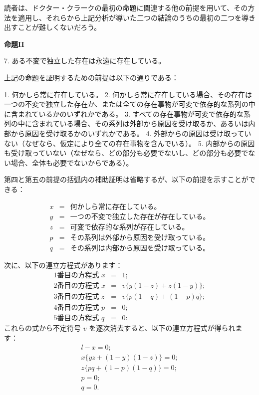 \documentclass[a4paper,11pt,openany]{ltjsbook}
\begin{document}
読者は、ドクター・クラークの最初の命題に関連する他の前提を用いて、その方法を適用し、それらから上記分析が導いた二つの結論のうちの最初の二つを導き出すことが難しくないだろう。

\textbf{命題II}

7. ある不変で独立した存在は永遠に存在している。

上記の命題を証明するための前提は以下の通りである：

1. 何かしら常に存在している。
2. 何かしら常に存在している場合、その存在は一つの不変で独立した存在か、または全ての存在事物が可変で依存的な系列の中に含まれているかのいずれかである。
3. すべての存在事物が可変で依存的な系列の中に含まれている場合、その系列は外部から原因を受け取るか、あるいは内部から原因を受け取るかのいずれかである。
4. 外部からの原因は受け取っていない（なぜなら、仮定により全ての存在事物を含んでいる）。
5. 内部からの原因も受け取っていない（なぜなら、どの部分も必要でないし、どの部分も必要でない場合、全体も必要でないからである）。

第四と第五の前提の括弧内の補助証明は省略するが、以下の前提を示すことができる：

\begin{eqnarray*}
x &=& \text{何かしら常に存在している。} \\
y &=& \text{一つの不変で独立した存在が存在している。} \\
z &=& \text{可変で依存的な系列が存在している。} \\
p &=& \text{その系列は外部から原因を受け取っている。} \\
q &=& \text{その系列は内部から原因を受け取っている。}
\end{eqnarray*}

次に、以下の連立方程式があります：
\begin{eqnarray*}
\textrm{1番目の方程式 } x &=& 1 ; \\
\textrm{2番目の方程式 } x &=& v \{y(1 - z) + z(1 - y)\} ; \\
\textrm{3番目の方程式 } z &=& v \{p(1 - q) + (1 - p)q\} ; \\
\textrm{4番目の方程式 } p &=& 0; \\
\textrm{5番目の方程式 } q &=& 0 :
\end{eqnarray*}
これらの式から不定符号 $v$ を逐次消去すると、以下の連立方程式が得られます：
\setcounter{equation}{0}
\begin{eqnarray}
l - x = 0; \\ %
x \{yz + (1 - y)(1 - z)\} = 0; \\ %
z \{pq + (1 - p)(1 - q)\} = 0; \\ %
p = 0; \\ %
q = 0.  %
\end{eqnarray}
\end{document}
